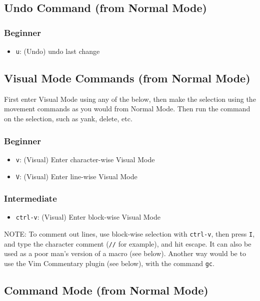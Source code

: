 \documentclass[11pt]{article}
\begin{document}
\subsection{Undo Command (from Normal Mode)}
\label{sec:org2c34474}
\subsubsection{Beginner}
\label{sec:org7862dea}
\begin{itemize}
\item \texttt{u}: (Undo) undo last change
\end{itemize}
\subsection{Visual Mode Commands (from Normal Mode)}
\label{sec:orga6e9167}
First enter Visual Mode using any of the below, then make the selection using
the movement commands as you would from Normal Mode. Then run the command on the
selection, such as yank, delete, etc.
\subsubsection{Beginner}
\label{sec:org0a716d0}
\begin{itemize}
\item \texttt{v}: (Visual) Enter character-wise Visual Mode
\item \texttt{V}: (Visual) Enter line-wise Visual Mode
\end{itemize}
\subsubsection{Intermediate}
\label{sec:org3d9d82b}
\begin{itemize}
\item \texttt{ctrl-v}: (Visual) Enter block-wise Visual Mode
\end{itemize}

NOTE: To comment out lines, use block-wise selection with \texttt{ctrl-v}, then press
\texttt{I}, and type the character comment (\texttt{//} for example), and hit escape. It can
also be used as a poor man's version of a macro (see below). Another way would
be to use the Vim Commentary plugin (see below), with the command \texttt{gc}.
\subsection{Command Mode (from Normal Mode)}
\label{sec:orgb87f4a4}
\end{document}
